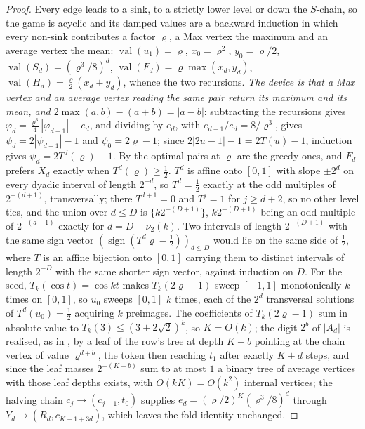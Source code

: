 \documentclass[11pt]{article}
\theoremstyle{plain}
\theoremstyle{definition}
\DeclareMathOperator{\val}{val}
\begin{document}
\begin{proof}
Every edge leads to a sink, to a strictly lower level or down the $S$-chain,
so the game is acyclic and its damped values are a backward induction in
which every non-sink contributes a factor $\varrho$, a Max vertex the maximum
and an average vertex the mean: $\val(u_1)=\varrho$, $x_0=\varrho^{2}$,
$y_0=\varrho/2$, $\val(S_d)=(\varrho^{3}/8)^{d}$,
$\val(F_d)=\varrho\max(x_d,y_d)$, $\val(H_d)=\tfrac\varrho2(x_d+y_d)$, whence
the two recursions. \emph{The device is that a Max vertex and an average
vertex reading the same pair return its maximum and its mean, and
$2\max(a,b)-(a+b)=|a-b|$}: subtracting the recursions gives
$\varphi_d=\tfrac{\varrho^{3}}4|\varphi_{d-1}|-e_d$, and dividing by $e_d$,
with $e_{d-1}/e_d=8/\varrho^{3}$, gives $\psi_d=2|\psi_{d-1}|-1$ and
$\psi_0=2\varrho-1$; since $2|2u-1|-1=2T(u)-1$, induction gives
$\psi_d=2T^{d}(\varrho)-1$. By  the optimal pairs at
$\varrho$ are the greedy ones, and $F_d$ prefers $X_d$ exactly when
$T^{d}(\varrho)\ge\tfrac12$. $T^{d}$ is affine onto $[0,1]$ with slope
$\pm2^{d}$ on every dyadic interval of length $2^{-d}$, so $T^{d}=\tfrac12$
exactly at the odd multiples of $2^{-(d+1)}$, transversally; there
$T^{d+1}=0$ and $T^{j}=1$ for $j\ge d+2$, so no other level ties, and the
union over $d\le D$ is $\{k2^{-(D+1)}\}$, $k2^{-(D+1)}$ being an odd multiple
of $2^{-(d+1)}$ exactly for $d=D-\nu_2(k)$. Two intervals of length
$2^{-(D+1)}$ with the same sign vector $(\operatorname{sign}(T^{d}\varrho-\tfrac12))_{d\le D}$
would lie on the same side of $\tfrac12$, where $T$ is an affine bijection
onto $[0,1]$ carrying them to distinct intervals of length $2^{-D}$ with the
same shorter sign vector, against induction on $D$. For the seed,
$T_k(\cos t)=\cos kt$ makes $T_k(2\varrho-1)$ sweep $[-1,1]$ monotonically
$k$ times on $[0,1]$, so $u_0$ sweeps $[0,1]$ $k$ times, each of the $2^{d}$
transversal solutions of $T^{d}(u_0)=\tfrac12$ acquiring $k$ preimages. The
coefficients of $T_k(2\varrho-1)$ sum in absolute value to $T_k(3)\le(3+2\sqrt2)^{k}$,
so $K=O(k)$; the digit $2^{b}$ of $|A_d|$ is realised, as in
, by a leaf of the row's tree at depth $K-b$
pointing at the chain vertex of value $\varrho^{d+b}$, the token then
reaching $t_1$ after exactly $K+d$ steps, and since the leaf masses
$2^{-(K-b)}$ sum to at most $1$ a binary tree of average vertices with
those leaf depths exists, with $O(kK)=O(k^{2})$ internal vertices; the
halving chain $c_j\to(c_{j-1},t_0)$ supplies
$e_d=(\varrho/2)^{K}(\varrho^{3}/8)^{d}$ through $Y_d\to(R_d,c_{K-1+3d})$,
which leaves the fold identity unchanged.
\end{proof}
\end{document}
